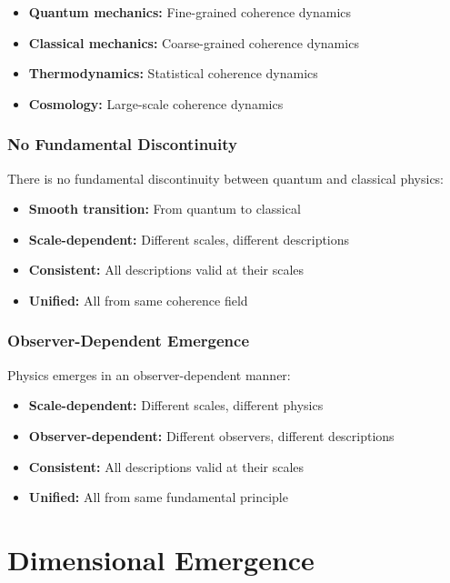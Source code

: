 \documentclass[11pt]{article}
\theoremstyle{definition}
\begin{document}
\begin{itemize}
\item \textbf{Quantum mechanics:} Fine-grained coherence dynamics
\item \textbf{Classical mechanics:} Coarse-grained coherence dynamics
\item \textbf{Thermodynamics:} Statistical coherence dynamics
\item \textbf{Cosmology:} Large-scale coherence dynamics
\end{itemize}

\subsubsection{No Fundamental Discontinuity}

There is no fundamental discontinuity between quantum and classical physics:

\begin{itemize}
\item \textbf{Smooth transition:} From quantum to classical
\item \textbf{Scale-dependent:} Different scales, different descriptions
\item \textbf{Consistent:} All descriptions valid at their scales
\item \textbf{Unified:} All from same coherence field
\end{itemize}

\subsubsection{Observer-Dependent Emergence}

Physics emerges in an observer-dependent manner:

\begin{itemize}
\item \textbf{Scale-dependent:} Different scales, different physics
\item \textbf{Observer-dependent:} Different observers, different descriptions
\item \textbf{Consistent:} All descriptions valid at their scales
\item \textbf{Unified:} All from same fundamental principle
\end{itemize}

\section{Dimensional Emergence}
\end{document}

